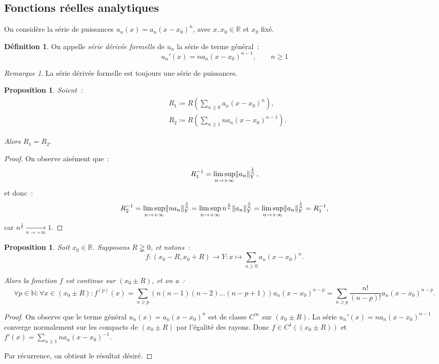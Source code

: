 \documentclass{report}
\newtheorem{prp}[thm]{Proposition}
\theoremstyle{definition}
\newtheorem{déf}[thm]{Définition}
\theoremstyle{remark}
\newtheorem*{rmq}{Remarque}
\newcommand{\R}{\mathbb R}
\newcommand{\N}{\mathbb N}
\newcommand{\pinfty}{{+\infty}}
\begin{document}
		\subsection{Fonctions réelles analytiques}
			On considère la série de puissances $u_n(x) = a_n(x - x_0)^n$, avec $x, x_0 \in \R$ et $x_0$ fixé.

			\begin{déf} On appelle \textit{série dérivée formelle} de $u_n$ la série de terme général~:
			\[u_n'(x) = na_n(x-x_0)^{n-1}, \qquad n \geq 1\]
			\end{déf}

			\begin{rmq} La série dérivée formelle est toujours une série de puissances.
			\end{rmq}

			\begin{prp} Soient~:
			\begin{align*}
				&R_1 \coloneqq R\left(\sum_{n \geq 0}a_n(x-x_0)^n\right), \\
				&R_2 \coloneqq R\left(\sum_{n \geq 1}na_n(x-x_0)^{n-1}\right).
			\end{align*}

			Alors $R_1 = R_2$.
			\end{prp}

			\begin{proof} On observe aisément que~:
			\[R_1^{-1} = \limsup_{n \to \pinfty}\norm {a_n}_Y^{\frac 1n},\]
			et donc~:
			\[R_2^{-1} = \limsup_{n \to \pinfty}\norm {na_n}_Y^{\frac 1n} = \limsup_{n \to \pinfty}n^{\frac 1n}\norm {a_n}_Y^{\frac 1n}
				= \limsup_{n \to \pinfty}\norm {a_n}_Y^{\frac 1n} = R_1^{-1},\]
			car $n^{\frac 1n} \xrightarrow[n \to \pinfty]{} 1$.
			\end{proof}

			\begin{prp}\label{prp:formuledérivéepsdp} Soit $x_0 \in \R$. Supposons $R \gneqq 0$, et notons~:
			\[f : (x_0-R, x_0+R) \to Y : x \mapsto \sum_{n \geq 0}a_n(x-x_0)^n.\]

			Alors la fonction $f$ est continue sur $(x_0 \pm R)$, et on a~:
			\[\forall p \in \N : \forall x \in (x_0 \pm R) : f^{(p)}(x) = \sum_{n \geq p}\left(n(n-1)(n-2)\ldots(n-p+1)\right)a_n(x-x_0)^{n-p}
				= \sum_{n \geq p}\frac {n!}{(n-p)!}a_n(x-x_0)^{n-p}.\]
			\end{prp}

			\begin{proof} On observe que le terme général $u_n(x) = a_n(x-x_0)^n$ est de classe $C^\infty$ sur $(x_0 \pm R)$. La série
			$u_n'(x) = na_n(x-x_0)^{n-1}$ converge normalement sur les compacts de $(x_0 \pm R)$ par l'égalité des rayons. Donc $f \in C^1\left((x_0 \pm R)\right)$
			et $f'(x) = \sum_{n \geq 1}na_n(x-x_0)^{-1}$.

			Par récurrence, on obtient le résultat désiré.
			\end{proof}
\end{document}
